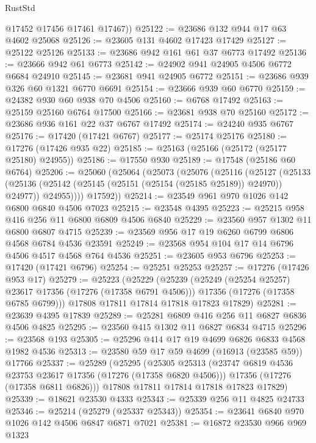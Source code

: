 \begin{lexlean}{RustStd}
\begin{coremodule}
        @17452
        @17456
        @17461
        @17467))
@25122 := @23686 @132 @944 @17 @63 @4602 @25068
@25126 := @23605 @131 @4602 @17423 @17429
@25127 := @25122 @25126
@25133 := @23686 @942 @161 @61 @37 @6773 @17492
@25136 := @23666 @942 @61 @6773
@25142 := @24902 @941 @24905 @4506 @6772 @6684 @24910
@25145 := @23681 @941 @24905 @6772
@25151 := @23686 @939 @326 @60 @1321 @6770 @6691
@25154 := @23666 @939 @60 @6770
@25159 := @24382 @930 @60 @938 @70 @4506
@25160 := @6768 @17492
@25163 := @25159 @25160 @6764 @17500
@25166 := @23681 @938 @70 @25160
@25172 := @23686 @936 @161 @22 @37 @6767 @17492
@25174 := @24240 @935 @6767
@25176 := @17420 (@17421 @6767)
@25177 := @25174 @25176
@25180 := @17276 (@17426 @935 @22)
@25185 := @25163 (@25166 (@25172 (@25177 @25180) @24955))
@25186 := @17550 @930
@25189 := @17548 (@25186 @60 @6764)
@25206 := @25060
    (@25064
      (@25073
        (@25076
          (@25116
            (@25127
              (@25133
                (@25136 (@25142 (@25145 (@25151 (@25154 (@25185 @25189)) @24970)) @24977))
                @24955))))
        @17592))
@25214 := @23549 @961 @970 @1026 @142 @6800 @6840 @4506 @7023
@25215 := @23548 @4395
@25223 := @25215 @958 @416 @256 @11 @6800 @6809 @4506 @6840
@25229 := @23560 @957 @1302 @11 @6800 @6807 @4715
@25239 := @23569 @956 @17 @19 @6260 @6799 @6806 @4568 @6784 @4536 @23591
@25249 := @23568 @954 @104 @17 @14 @6796 @4506 @4517 @4568 @764 @4536
@25251 := @23605 @953 @6796
@25253 := @17420 (@17421 @6796)
@25254 := @25251 @25253
@25257 := @17276 (@17426 @953 @17)
@25279 := @25223
    (@25229
      (@25239
        (@25249 (@25254 @25257) @23617 @17356 (@17276 (@17358 @6791 @4506)))
        @17356
        (@17276 (@17358 @6785 @6799)))
      @17808
      @17811
      @17814
      @17818
      @17823
      @17829)
@25281 := @23639 @4395 @17839
@25289 := @25281 @6809 @416 @256 @11 @6827 @6836 @4506 @4825
@25295 := @23560 @415 @1302 @11 @6827 @6834 @4715
@25296 := @23568 @193
@25305 := @25296 @414 @17 @19 @4699 @6826 @6833 @4568 @1982 @4536
@25313 := @23580 @59 @17 @59 @4699 (@16913 (@23585 @59)) @17766
@25337 := @25289
    (@25295
      (@25305
        @25313
        (@23747 @6819 @4536 @23753 @23617 @17356 (@17276 (@17358 @6820 @4506)))
        @17356
        (@17276 (@17358 @6811 @6826)))
      @17808
      @17811
      @17814
      @17818
      @17823
      @17829)
@25339 := @18621 @23530 @4333
@25343 := @25339 @256 @11 @4825 @24733
@25346 := @25214 (@25279 (@25337 @25343))
@25354 := @23641 @6840 @970 @1026 @142 @4506 @6847 @6871 @7021
@25381 := @16872
    @23530
    @966
    @969
    @1323

\end{coremodule}
\end{lexlean}
